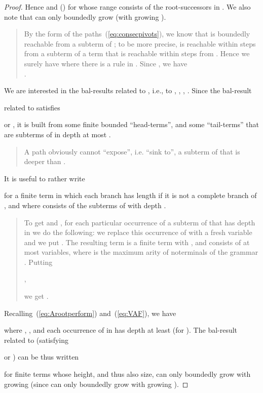 \documentclass{llncs}
\begin{document}
\begin{proof}
Hence  and 
() for
 whose range consists of the root-successors in . 
We also note that
 can only boundedly grow (with
growing ).
\begin{quote}
	{\small	
		By the form of the paths~(\ref{eq:consecpivots}),
		we know that 
		 is boundedly reachable from a
subterm of ; to be more precise, 
is reachable within  steps from a subterm of a term that is
reachable within  steps from . Hence we surely have
 where 
 there is a rule
 in .
Since , we have 
\\
.
}
\end{quote}
We are interested in the bal-results related to 
, i.e.,
to , 
, , . 
Since the bal-result

related to  satisfies 

or ,  
it is built from some finite bounded ``head-terms'', and some
``tail-terms'' that are subterms of  in depth at most
. 
\begin{quote}
	{\small	
A path  obviously cannot ``expose'', i.e.  ``sink to'',
a subterm of  that is deeper than .
}
\end{quote}
It is useful to rather write  

for a finite term  in which each branch has length 
if it is not a complete branch of , and where  consists
of the subterms of  with depth . 
\begin{quote}
	{\small	
To get  and , for each particular 
occurrence of a subterm  of  that has depth
 in  we do the following:
we replace this occurrence of  with a fresh variable  and
we put . The resulting term  is a finite term with
, and
 consists of at most  variables,
where  is the maximum arity of noterminals of the grammar .
Putting 
\begin{center}
,
\end{center}
we get 
.
}
	\end{quote}
Recalling~(\ref{eq:Arootperform}) and~(\ref{eq:VAF}), we have
	\begin{center}
		
\end{center}
where 
,
,
and 
each
occurrence of  in  has depth at least
 (for ).
The bal-result  related to  (satisfying

or ) can be thus written
\begin{center}
 
\end{center}
for finite terms  whose
height, and thus also size,
can only boundedly grow with growing 
(since  can only boundedly grow with growing ).


\end{proof}
\end{document}
